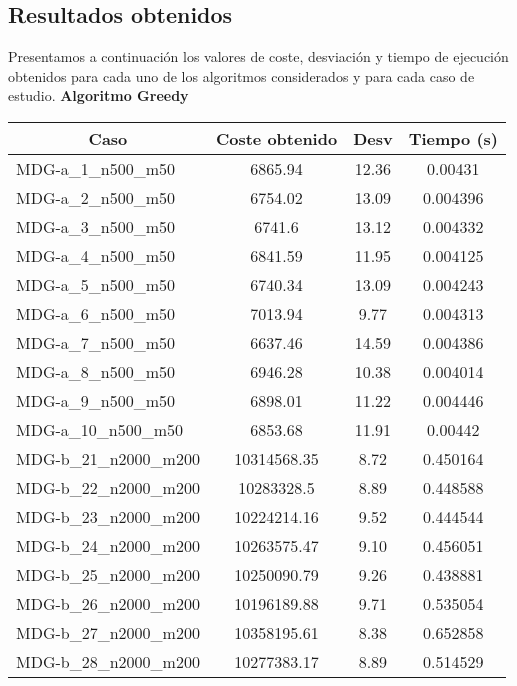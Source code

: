 \documentclass[11pt,a4paper]{article}
\begin{document}
	\subsection{Resultados obtenidos}
	
	Presentamos a continuación los valores de coste, desviación  y tiempo de ejecución obtenidos para cada uno de los algoritmos considerados y para cada caso de estudio.
	\newpage
	\textbf{Algoritmo Greedy}
\begin{table}[H]
	\begin{center}
		\begin{tabular}{|l|c|c|c|} 
			\hline
			\multicolumn{1}{|c|}{\textbf{Caso}} & \textbf{Coste obtenido} & \textbf{Desv} & \textbf{Tiempo (s)} \\ \hline
			MDG-a\_1\_n500\_m50 & 6865.94 & 12.36 & 0.00431 \\ \hline
			MDG-a\_2\_n500\_m50 & 6754.02 & 13.09 & 0.004396 \\ \hline
			MDG-a\_3\_n500\_m50 & 6741.6 & 13.12 & 0.004332 \\ \hline
			MDG-a\_4\_n500\_m50 & 6841.59 & 11.95 & 0.004125 \\ \hline
			MDG-a\_5\_n500\_m50 & 6740.34 & 13.09 & 0.004243 \\ \hline
			MDG-a\_6\_n500\_m50 & 7013.94 & 9.77 & 0.004313 \\ \hline
			MDG-a\_7\_n500\_m50 & 6637.46 & 14.59 & 0.004386 \\ \hline
			MDG-a\_8\_n500\_m50 & 6946.28 & 10.38 & 0.004014 \\ \hline
			MDG-a\_9\_n500\_m50 & 6898.01 & 11.22 & 0.004446 \\ \hline
			MDG-a\_10\_n500\_m50 & 6853.68 & 11.91 & 0.00442 \\ \hline
			MDG-b\_21\_n2000\_m200 & 10314568.35 & 8.72 & 0.450164 \\ \hline
			MDG-b\_22\_n2000\_m200 & 10283328.5 & 8.89 & 0.448588 \\ \hline
			MDG-b\_23\_n2000\_m200 & 10224214.16 & 9.52 & 0.444544 \\ \hline
			MDG-b\_24\_n2000\_m200 & 10263575.47 & 9.10 & 0.456051 \\ \hline
			MDG-b\_25\_n2000\_m200 & 10250090.79 & 9.26 & 0.438881 \\ \hline
			MDG-b\_26\_n2000\_m200 & 10196189.88 & 9.71 & 0.535054 \\ \hline
			MDG-b\_27\_n2000\_m200 & 10358195.61 & 8.38 & 0.652858 \\ \hline
			MDG-b\_28\_n2000\_m200 & 10277383.17 & 8.89 & 0.514529 \\ \hline

\end{tabular}
\end{center}
\end{table}
\end{document}
